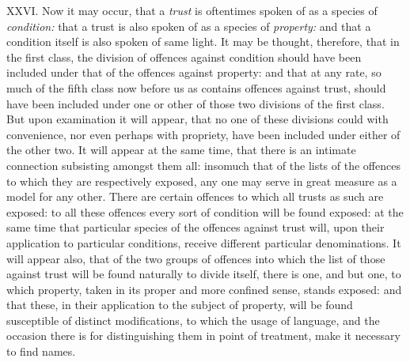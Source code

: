 \documentclass[12pt]{report}
\begin{document}
XXVI. Now it may occur, that a \emph{trust} is oftentimes spoken of as a
species of \emph{condition:} that a trust is also spoken of as a species
of \emph{property:} and that a condition itself is also spoken of same
light. It may be thought, therefore, that in the first class, the
division of offences against condition should have been included under
that of the offences against property: and that at any rate, so much of
the fifth class now before us as contains offences against trust, should
have been included under one or other of those two divisions of the
first class. But upon examination it will appear, that no one of these
divisions could with convenience, nor even perhaps with propriety, have
been included under either of the other two. It will appear at the same
time, that there is an intimate connection subsisting amongst them all:
insomuch that of the lists of the offences to which they are
respectively exposed, any one may serve in great measure as a model for
any other. There are certain offences to which all trusts as such are
exposed: to all these offences every sort of condition will be found
exposed: at the same time that particular species of the offences
against trust will, upon their application to particular conditions,
receive different particular denominations. It will appear also, that of
the two groups of offences into which the list of those against trust
will be found naturally to divide itself, there is one, and but one, to
which property, taken in its proper and more confined sense, stands
exposed: and that these, in their application to the subject of
property, will be found susceptible of distinct modifications, to which
the usage of language, and the occasion there is for distinguishing them
in point of treatment, make it necessary to find names.
\end{document}

